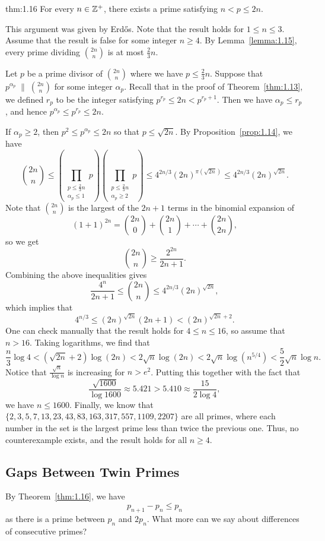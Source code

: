 \begin{theo}[Chebyshev]{thm:1.16}
For every $n \in \mathbb{Z}^+$, there exists a prime satisfying $n < p \leq 2n$. 
\end{theo}
\begin{pf}
This argument was given by Erd\H{o}s. Note that the result holds for $1 \leq n \leq 3$. Assume that the 
result is false for some integer $n \geq 4$. By Lemma~\ref{lemma:1.15}, every prime dividing 
$\binom{2n}n$ is at most $\frac23n$. 

Let $p$ be a prime divisor of $\binom{2n}n$ where we have $p \leq \frac23n$. Suppose that 
$p^{\alpha_p} \;\|\; \binom{2n}n$ for some integer $\alpha_p$. Recall that in the proof of 
Theorem~\ref{thm:1.13}, we defined $r_p$ to be the integer satisfying $p^{r_p} \leq 2n < p^{r_p+1}$. 
Then we have $\alpha_p \leq r_p$, and hence $p^{\alpha_p} \leq p^{r_p} \leq 2n$. 

If $\alpha_p \geq 2$, then $p^2 \leq p^{\alpha_p} \leq 2n$ so that $p \leq \sqrt{2n}$. By 
Proposition~\ref{prop:1.14}, we have 
\[ \binom{2n}n \leq \left( \prod_{\substack{p\leq\frac23n\\ \alpha_p\leq 1}} p \right) 
\left( \prod_{\substack{p\leq\frac23n\\ \alpha_p\geq 2}} p \right) \leq 4^{2n/3} (2n)^{\pi(\sqrt{2n})}
\leq 4^{2n/3} (2n)^{\sqrt{2n}}. \]
Note that $\binom{2n}n$ is the largest of the $2n+1$ terms in the binomial expansion of 
\[ (1+1)^{2n} = \binom{2n}0 + \binom{2n}1 + \cdots + \binom{2n}{2n}, \]
so we get 
\[ \binom{2n}n \geq \frac{2^{2n}}{2n+1}. \]
Combining the above inequalities gives 
\[ \frac{4^n}{2n+1} \leq \binom{2n}n \leq 4^{2n/3} (2n)^{\sqrt{2n}}, \]
which implies that 
\[ 4^{n/3} \leq (2n)^{\sqrt{2n}} (2n+1) < (2n)^{\sqrt{2n}+2}. \]
One can check manually that the result holds for $4 \leq n \leq 16$, so assume that $n > 16$. Taking 
logarithms, we find that 
\[ \frac{n}3 \log 4 < (\sqrt{2n}+2)\log(2n) < 2\sqrt n \log(2n) < 2\sqrt n \log(n^{5/4}) < \frac52 \sqrt n \log n. \]
Notice that $\frac{\sqrt n}{\log n}$ is increasing for 
$n > e^2$. Putting this together with the fact that 
\[ \frac{\sqrt{1600}}{\log 1600} \approx 5.421 > 5.410 \approx \frac{15}{2\log4}, \]
we have $n \leq 1600$. Finally, we know that $\{2, 3, 5, 7, 13, 23, 43, 83, 163, 317, 557, 1109, 2207\}$
are all primes, where each number in the set is the largest prime less than twice the previous one. 
Thus, no counterexample exists, and the result holds for all $n \geq 4$.
\end{pf}

\subsection{Gaps Between Twin Primes}
By Theorem~\ref{thm:1.16}, we have 
\[ p_{n+1} - p_n \leq p_n \]
as there is a prime between $p_n$ and $2p_n$. What more can we say about differences of consecutive primes?

